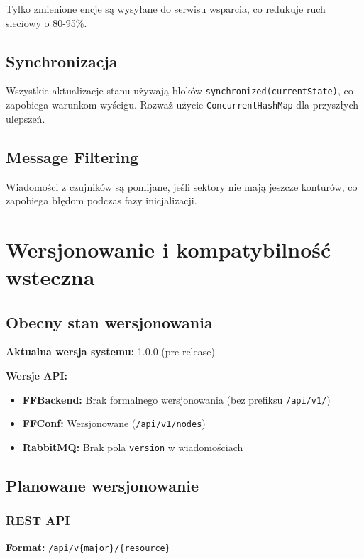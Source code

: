 \documentclass[11pt,a4paper] {article}
\begin{document}
Tylko zmienione encje są wysyłane do serwisu wsparcia, co redukuje ruch sieciowy o 80-95\%.

\subsection{Synchronizacja}

Wszystkie aktualizacje stanu używają bloków \texttt{synchronized(currentState)}, co zapobiega warunkom wyścigu. Rozważ użycie \texttt{ConcurrentHashMap} dla przyszłych ulepszeń.

\subsection{Message Filtering}

Wiadomości z czujników są pomijane, jeśli sektory nie mają jeszcze konturów, co zapobiega błędom podczas fazy inicjalizacji.

\section{Wersjonowanie i kompatybilność wsteczna}

\subsection{Obecny stan wersjonowania}

\textbf{Aktualna wersja systemu:} 1.0.0 (pre-release)

\textbf{Wersje API:}
\begin{itemize}
    \item \textbf{FFBackend:} Brak formalnego wersjonowania (bez prefiksu \texttt{/api/v1/})
    \item \textbf{FFConf:} Wersjonowane (\texttt{/api/v1/nodes})
    \item \textbf{RabbitMQ:} Brak pola \texttt{version} w wiadomościach
\end{itemize}

\subsection{Planowane wersjonowanie}

\subsubsection{REST API}

\textbf{Format:} \texttt{/api/v\{major\}/\{resource\}}
\end{document}
